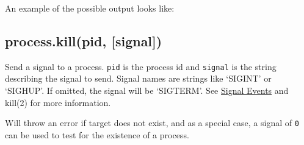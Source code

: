 An example of the possible output looks like:

\begin{Shaded}
\begin{Highlighting}[]
\NormalTok{\{ }\NormalTok{:}
   \NormalTok{\{ }\NormalTok{: [],}
     \NormalTok{: }\NormalTok{,}
     \NormalTok{: [],}
     \NormalTok{: [],}
     \NormalTok{: [] \},}
  \NormalTok{:}
   \NormalTok{\{ }\NormalTok{: }\NormalTok{,}
     \NormalTok{: }\NormalTok{,}
     \NormalTok{: }\NormalTok{,}
     \NormalTok{: }\NormalTok{,}
     \NormalTok{: }\NormalTok{,}
     \NormalTok{: }\NormalTok{,}
     \NormalTok{: }\NormalTok{,}
     \NormalTok{: }\NormalTok{,}
     \NormalTok{: }\NormalTok{,}
     \NormalTok{: }\NormalTok{,}
     \NormalTok{: }\NormalTok{,}
     \NormalTok{: }\NormalTok{,}
     \NormalTok{: }\NormalTok{,}
     \NormalTok{: } \NormalTok{\} \}}
\end{Highlighting}
\end{Shaded}

\subsection{process.kill(pid,
{[}signal{]})}\label{process.killpid-signal}

Send a signal to a process. \texttt{pid} is the process id and
\texttt{signal} is the string describing the signal to send. Signal
names are strings like `SIGINT' or `SIGHUP'. If omitted, the signal will
be `SIGTERM'. See \hyperref[processux5fsignalux5fevents]{Signal Events}
and kill(2) for more information.

Will throw an error if target does not exist, and as a special case, a
signal of \texttt{0} can be used to test for the existence of a process.

